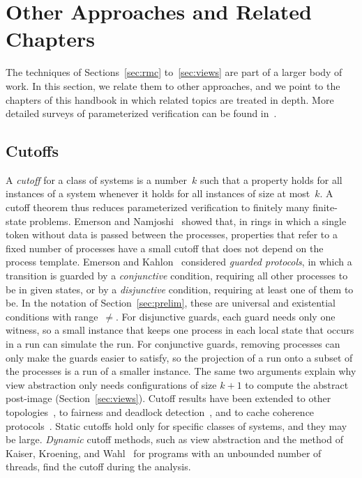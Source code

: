 \section{Other Approaches and Related Chapters}
\label{sec:other}

The techniques of Sections~\ref{sec:rmc} to~\ref{sec:views} are part of a
larger body of work. In this section, we relate them to other approaches, and
we point to the chapters of this handbook in which related topics are treated
in depth. More detailed surveys of parameterized verification can be found
in~\cite{AST18,BJKKRVW15,Esp14,ZP04}.

\subsection{Cutoffs}

A \emph{cutoff} for a class of systems is a number~$k$ such that a property
holds for all instances of a system whenever it holds for all instances of size
at most~$k$. A cutoff theorem thus reduces parameterized verification to
finitely many finite-state problems. Emerson and Namjoshi~\cite{EN95} showed
that, in rings in which a single token without data is passed between the
processes, properties that refer to a fixed number of processes have a small
cutoff that does not depend on the process template. Emerson and
Kahlon~\cite{EK00} considered \emph{guarded protocols}, in which a transition is
guarded by a \emph{conjunctive} condition, requiring all other processes to be
in given states, or by a \emph{disjunctive} condition, requiring at least one
of them to be. In the notation of Section~\ref{sec:prelim}, these are
universal and existential conditions with range~$\neq$. For disjunctive
guards, each guard needs only one witness, so a small instance that keeps one
process in each local state that occurs in a run can simulate the run. For
conjunctive guards, removing processes can only make the guards easier to
satisfy, so the projection of a run onto a subset of the processes is a run of
a smaller instance. The same two arguments explain why view abstraction only
needs configurations of size $k+1$ to compute the abstract post-image
(Section~\ref{sec:views}). Cutoff results have been extended to other
topologies~\cite{CTTV04,AJKR14}, to fairness and deadlock
detection~\cite{AJK16}, and to cache coherence protocols~\cite{EK03}. Static
cutoffs hold only for specific classes of systems, and they may be large.
\emph{Dynamic} cutoff methods, such as view abstraction and the method of
Kaiser, Kroening, and Wahl~\cite{KKW10} for programs with an unbounded number
of threads, find the cutoff during the analysis.

